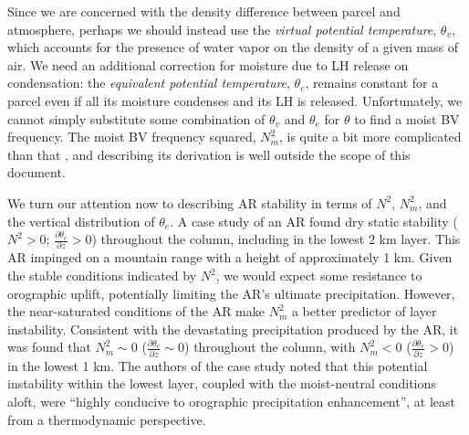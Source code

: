 \documentclass[letterpaper,12pt]{article}
\begin{document}
Since we are concerned with the density difference between parcel and atmosphere, perhaps we should instead use the \textit{virtual potential temperature}, $\theta_v$, which accounts for the presence of water vapor on the density of a given mass of air. We need an additional correction for moisture due to LH release on condensation: the \textit{equivalent potential temperature}, $\theta_e$, remains constant for a parcel even if all its moisture condenses and its LH is released. Unfortunately, we cannot simply substitute some combination of $\theta_v$ and $\theta_e$ for $\theta$ to find a moist BV frequency. The moist BV frequency squared, $N_m^2$, is quite a bit more complicated than that \cite{Durran1982OnFrequency}, and describing its derivation is well outside the scope of this document. 

We turn our attention now to describing AR stability in terms of $N^2$, $N_m^2$, and the vertical distribution of $\theta_e$. A case study of an AR \cite{Neiman2008MeteorologicalObservations} found dry static stability ($N^2 > 0$; $\frac{\partial\theta_e}{\partial z} > 0$) throughout the column, including in the lowest 2 km layer. This AR impinged on a mountain range with a height of approximately 1 km. Given the stable conditions indicated by $N^2$, we would expect some resistance to orographic uplift, potentially limiting the AR's ultimate precipitation. However, the near-saturated conditions of the AR make $N_m^2$ a better predictor of layer instability. Consistent with the devastating precipitation produced by the AR, it was found that $N_m^2 \sim 0$ ($\frac{\partial\theta_e}{\partial z} \sim 0$) throughout the column, with $N_m^2 < 0$ ($\frac{\partial\theta_e}{\partial z} > 0$) in the lowest 1 km. The authors of the case study noted that this potential instability within the lowest layer, coupled with the moist-neutral conditions aloft, were ``highly conducive to orographic precipitation enhancement'', at least from a thermodynamic perspective.  
\end{document}
